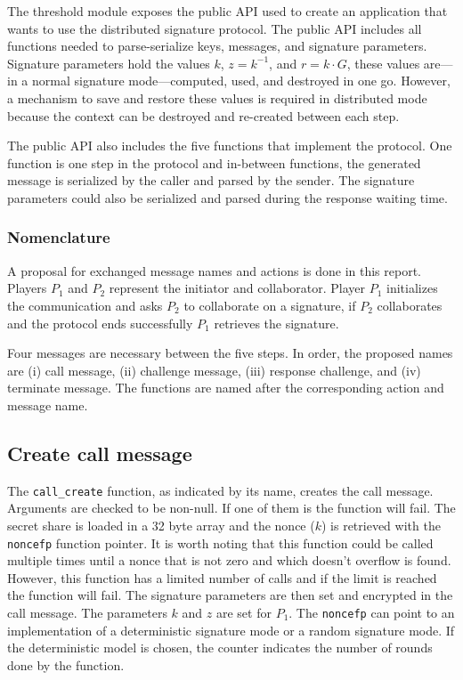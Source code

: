 The threshold module exposes the public API used to create an application that
wants to use the distributed signature protocol. The public API includes all
functions needed to parse-serialize keys, messages, and signature parameters.
Signature parameters hold the values $k$, $z = k^{-1}$, and $r = k \cdot G$,
these values are---in a normal signature mode---computed, used, and destroyed in
one go. However, a mechanism to save and restore these values is required in
distributed mode because the context can be destroyed and re-created between
each step.

The public API also includes the five functions that implement the protocol. One
function is one step in the protocol and in-between functions, the generated
message is serialized by the caller and parsed by the sender. The signature
parameters could also be serialized and parsed during the response waiting time.

\subsubsection{Nomenclature}

A proposal for exchanged message names and actions is done in this report.
Players $P_1$ and $P_2$ represent the initiator and collaborator. Player $P_1$
initializes the communication and asks $P_2$ to collaborate on a signature, if
$P_2$ collaborates and the protocol ends successfully $P_1$ retrieves the
signature.

Four messages are necessary between the five steps. In order, the proposed names
are (i) call message, (ii) challenge message, (iii) response challenge, and (iv)
terminate message. The functions are named after the corresponding action and
message name.

\subsection{Create call message}

The \texttt{call\_create} function, as indicated by its name, creates the call
message. Arguments are checked to be non-null.  If one of them is the function
will fail. The secret share is loaded in a 32 byte array and the nonce ($k$) is
retrieved with the \texttt{noncefp} function pointer. It is worth noting that
this function could be called multiple times until a nonce that is not zero and
which doesn't overflow is found. However, this function has a limited number of
calls and if the limit is reached the function will fail. The signature
parameters are then set and encrypted in the call message. The parameters $k$
and $z$ are set for $P_1$. The \texttt{noncefp} can point to an implementation
of a deterministic signature mode or a random \cite{rfc6979} signature mode. If
the deterministic model is chosen, the counter indicates the number of rounds
done by the function.


